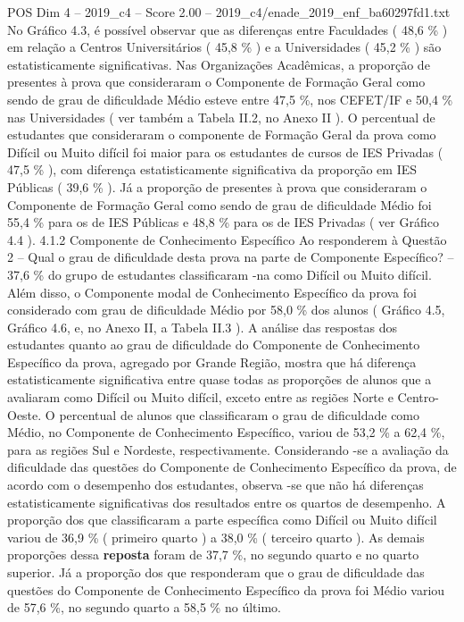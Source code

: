 \begin{textsample}{POS Dim 4 – 2019\_c4 – Score 2.00 – 2019\_c4/enade\_2019\_enf\_ba60297fd1.txt}
No Gráfico 4.3, é possível observar que as diferenças entre Faculdades ( 48,6 \% ) em relação a Centros Universitários ( 45,8 \% ) e a Universidades ( 45,2 \% ) são estatisticamente significativas.
Nas Organizações Acadêmicas, a proporção de presentes à prova que consideraram o Componente de Formação Geral como sendo de grau de dificuldade Médio esteve entre 47,5 \%, nos CEFET/IF e 50,4 \% nas Universidades ( ver também a Tabela II.2, no Anexo II ).
O percentual de estudantes que consideraram o componente de Formação Geral da prova como Difícil ou Muito difícil foi maior para os estudantes de cursos de IES Privadas ( 47,5 \% ), com diferença estatisticamente significativa da proporção em IES Públicas ( 39,6 \% ).
Já a proporção de presentes à prova que consideraram o Componente de Formação Geral como sendo de grau de dificuldade Médio foi 55,4 \% para os de IES Públicas e 48,8 \% para os de IES Privadas ( ver Gráfico 4.4 ). 4.1.2 Componente de Conhecimento Específico Ao responderem à Questão 2 – Qual o grau de dificuldade desta prova na parte de Componente Específico? – 37,6 \% do grupo de estudantes classificaram -na como Difícil ou Muito difícil.
Além disso, o Componente modal de Conhecimento Específico da prova foi considerado com grau de dificuldade Médio por 58,0 \% dos alunos ( Gráfico 4.5, Gráfico 4.6, e, no Anexo II, a Tabela II.3 ).
A análise das respostas dos estudantes quanto ao grau de dificuldade do Componente de Conhecimento Específico da prova, agregado por Grande Região, mostra que há diferença estatisticamente significativa entre quase todas as proporções de alunos que a avaliaram como Difícil ou Muito difícil, exceto entre as regiões Norte e Centro-Oeste.
O percentual de alunos que classificaram o grau de dificuldade como Médio, no Componente de Conhecimento Específico, variou de 53,2 \% a 62,4 \%, para as regiões Sul e Nordeste, respectivamente.
Considerando -se a avaliação da dificuldade das questões do Componente de Conhecimento Específico da prova, de acordo com o desempenho dos estudantes, observa -se que não há diferenças estatisticamente significativas dos resultados entre os quartos de desempenho.
A proporção dos que classificaram a parte específica como Difícil ou Muito difícil variou de 36,9 \% ( primeiro quarto ) a 38,0 \% ( terceiro quarto ).
As demais proporções dessa \textbf{reposta} foram de 37,7 \%, no segundo quarto e no quarto superior.
Já a proporção dos que responderam que o grau de dificuldade das questões do Componente de Conhecimento Específico da prova foi Médio variou de 57,6 \%, no segundo quarto a 58,5 \% no último.

\end{textsample}
